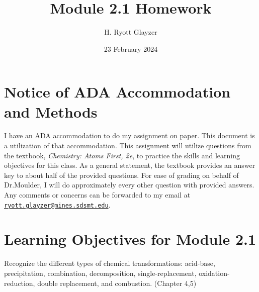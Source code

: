 \documentclass[10pt, letterpaper]{article}
\newcommand{\email}[1]{\href{mailto:#1}{\texttt{#1}}}
\begin{document}


\title{Module 2.1 Homework}
\author{H. Ryott Glayzer}
\date{23 February 2024}


\maketitle

\section*{Notice of ADA Accommodation and Methods}
I have an ADA accommodation to do my assignment on paper.
This document is a utilization of that accommodation.
This assignment will utilize questions from the textbook,
\textit{Chemistry: Atoms First, 2e}, to practice the skills
and learning objectives for this class.
As a general statement, the textbook provides an answer key
to about half of the provided questions.
For ease of grading on behalf of Dr.\@ Moulder, 
I will do approximately every other
question with provided answers.
Any comments or concerns can be forwarded to my email at
\email{ryott.glayzer@mines.sdsmt.edu}.

\section*{Learning Objectives for Module 2.1}


Recognize the different types of chemical transformations: acid-base, precipitation, combination,
decomposition, single-replacement, oxidation-reduction, double replacement, and combustion.
(Chapter 4,5)
\end{document}
